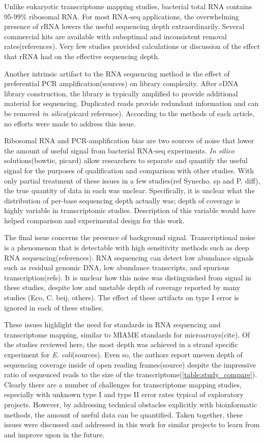Unlike eukaryotic transcriptome mapping studies, bacterial total RNA contains 95-99\% ribosomal RNA. For most RNA-seq applications, the overwhelming presence of rRNA lowers the useful sequencing depth extraordinarily. Several commercial kits are available with suboptimal and inconsistent removal rates(references). Very few studies provided calculations or discussion of the effect that rRNA had on the effective sequencing depth.

Another intrinsic artifact to the RNA sequencing method is the effect of preferential PCR amplification(sources) on library complexity. After cDNA library construction, the library is typically amplified to provide additional material for sequencing. Duplicated reads provide redundant information and can be removed \textit{in silico}(picard reference). According to the methods of each article, no efforts were made to address this issue.  

Ribosomal RNA and PCR-amplification bias are two sources of noise that lower the amount of useful signal from bacterial RNA-seq experiments. \textit{In silico} solutions(bowtie, picard) allow researchers to separate and quantify the useful signal for the purposes of qualification and comparison with other studies. With only partial treatment of these issues in a few studies(ref Synecho. sp and P. diff), the true quantity of data in each was unclear. Specifically, it is unclear what the distribution of per-base sequencing depth actually was; depth of coverage is highly variable in transcriptomic studies. Description of this variable would have helped comparison and experimental design for this work.

The final issue concerns the presence of background signal. Transcriptional noise is a phenomenon that is detectable with high sensitivity methods such as deep RNA sequencing(references). RNA sequencing can detect low abundance signals such as residual genomic DNA, low abundance transcripts, and spurious transcription(refs). It is unclear how this noise was distinguished from signal in these studies, despite low and unstable depth of coverage reported by many studies (Eco, C. beij, others). The effect of these artifacts on type I error is ignored in each of these studies.

These issues highlight the need for standards in RNA sequencing and transcriptome mapping, similar to MIAME standards for microarrays(cite). Of the studies reviewed here, the most depth was achieved in a strand specific experiment for \textit{E. coli}(sources). Even so, the authors report uneven depth of sequencing coverage inside of open reading frames(source) despite the impressive ratio of sequenced reads to the size of the transcriptome(\ref{table:study_compare}). Clearly there are a number of challenges for transcriptome mapping studies, especially with unknown type I and type II error rates typical of exploratory projects. However, by addressing technical obstacles explicitly with bioinformatic methods, the amount of useful data can be quantified. Taken together, these issues were discussed and addressed in this work for similar projects to learn from and improve upon in the future.

